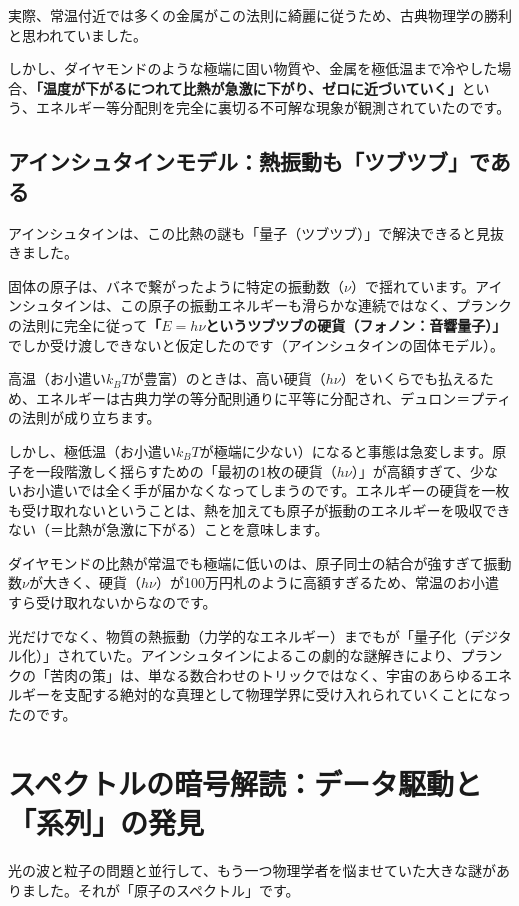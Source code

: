 実際、常温付近では多くの金属がこの法則に綺麗に従うため、古典物理学の勝利と思われていました。

しかし、ダイヤモンドのような極端に固い物質や、金属を極低温まで冷やした場合、\textbf{「温度が下がるにつれて比熱が急激に下がり、ゼロに近づいていく」}という、エネルギー等分配則を完全に裏切る不可解な現象が観測されていたのです。

\subsection{アインシュタインモデル：熱振動も「ツブツブ」である}

アインシュタインは、この比熱の謎も「量子（ツブツブ）」で解決できると見抜きました。

固体の原子は、バネで繋がったように特定の振動数（\(\nu\)）で揺れています。アインシュタインは、この原子の振動エネルギーも滑らかな連続ではなく、プランクの法則に完全に従って\textbf{「\(E = h\nu\)というツブツブの硬貨（フォノン：音響量子）」}でしか受け渡しできないと仮定したのです（アインシュタインの固体モデル）。

高温（お小遣い\(k_B T\)が豊富）のときは、高い硬貨（\(h\nu\)）をいくらでも払えるため、エネルギーは古典力学の等分配則通りに平等に分配され、デュロン＝プティの法則が成り立ちます。

しかし、極低温（お小遣い\(k_B T\)が極端に少ない）になると事態は急変します。原子を一段階激しく揺らすための「最初の1枚の硬貨（\(h\nu\)）」が高額すぎて、少ないお小遣いでは全く手が届かなくなってしまうのです。エネルギーの硬貨を一枚も受け取れないということは、熱を加えても原子が振動のエネルギーを吸収できない（＝比熱が急激に下がる）ことを意味します。

ダイヤモンドの比熱が常温でも極端に低いのは、原子同士の結合が強すぎて振動数\(\nu\)が大きく、硬貨（\(h\nu\)）が100万円札のように高額すぎるため、常温のお小遣すら受け取れないからなのです。

光だけでなく、物質の熱振動（力学的なエネルギー）までもが「量子化（デジタル化）」されていた。アインシュタインによるこの劇的な謎解きにより、プランクの「苦肉の策」は、単なる数合わせのトリックではなく、宇宙のあらゆるエネルギーを支配する絶対的な真理として物理学界に受け入れられていくことになったのです。

\section{スペクトルの暗号解読：データ駆動と「系列」の発見}

光の波と粒子の問題と並行して、もう一つ物理学者を悩ませていた大きな謎がありました。それが「原子のスペクトル」です。

